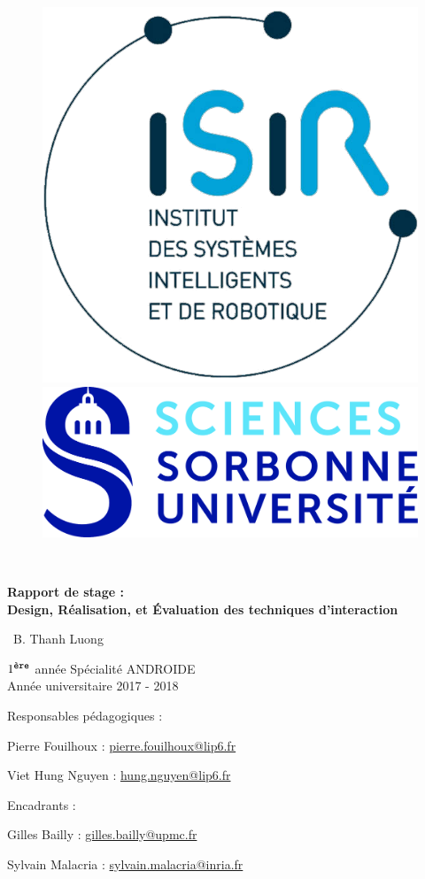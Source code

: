 \documentclass[12pt,a4paper]{article}
\begin{document}
\begin{titlepage}
	\begin{figure}
	\centering
	\begin{minipage}{.5\textwidth}
  	\includegraphics[width=.5\linewidth]{ISIR.png}
	\end{minipage}%
	\begin{minipage}{.5\textwidth}
  	\centering
  	\includegraphics[width=.8\linewidth]{SU.jpg}
	\end{minipage}
	\end{figure}
	\centering
	\par
	{\scshape\large \  \par}
	\vspace{2.5cm}
	{\huge\bfseries Rapport de stage :\\
		Design, Réalisation, et Évaluation des techniques d'interaction\par}
	\vspace{2cm}
	{\Large\ B. Thanh Luong \par}
	\vspace{0.5cm}
	{$1^{\texttt{\footnotesize ère}}$ année Spécialité ANDROIDE\\}
	{Année universitaire 2017 - 2018}
	\vfill
	\begin{minipage}{.5\textwidth}
	\centering
  	Responsables pédagogiques :\par
	Pierre Fouilhoux : \href{mailto:pierre.fouilhoux@lip6.fr}{pierre.fouilhoux@lip6.fr}\par
	Viet Hung Nguyen : \href{mailto:hung.nguyen@lip6.fr}{hung.nguyen@lip6.fr}\par
	\end{minipage}%
	\begin{minipage}{.5\textwidth}
  	\centering
  	Encadrants :\par
	Gilles Bailly : \href{mailto:gilles.bailly@upmc.fr}{gilles.bailly@upmc.fr}\par
	Sylvain Malacria : \href{mailto:sylvain.malacria@inria.fr}{sylvain.malacria@inria.fr}
	\end{minipage}
	\vfill


\end{titlepage}
\end{document}
